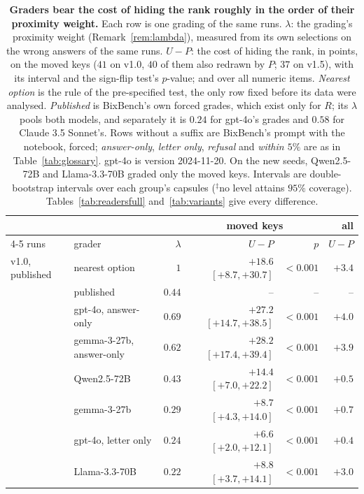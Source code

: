 \documentclass{article}
\begin{document}
\begin{table}[htbp]
\centering\footnotesize\setlength{\tabcolsep}{3pt}
\caption{\textbf{Graders bear the cost of hiding the rank roughly in the order of their proximity weight.} Each row is
one grading of the same runs. $\lambda$: the grading's proximity weight (Remark~\ref{rem:lambda}), measured from its
own selections on the wrong answers of the same runs. $U-P$: the cost of hiding the rank, in points, on the moved
keys ($41$ on v1.0, $40$ of them also redrawn by $P$; $37$ on v1.5), with its interval and the sign-flip test's
$p$-value; and over all numeric items. \emph{Nearest option} is the rule of the pre-specified test, the only row fixed
before its data were analysed. \emph{Published} is BixBench's own forced grades, which exist only for $R$; its
$\lambda$ pools both models, and separately it is $0.24$ for gpt-4o's grades and $0.58$ for Claude 3.5 Sonnet's.
Rows without a suffix are BixBench's prompt with the notebook, forced; \emph{answer-only}, \emph{letter only},
\emph{refusal} and \emph{within $5\%$} are as in Table~\ref{tab:glossary}. gpt-4o is version 2024-11-20. On the new seeds,
Qwen2.5-72B and Llama-3.3-70B graded only the moved keys. Intervals are double-bootstrap intervals over each group's
capsules ($^{\ddagger}$no level attains $95\%$ coverage). Tables~\ref{tab:readersfull} and~\ref{tab:variants} give
every difference.}
\label{tab:readers2}
\begin{tabular}{llrrrr}
\toprule
& & & \multicolumn{2}{c}{moved keys} & all\\
\cmidrule(lr){4-5}
runs & grader & $\lambda$ & $U-P$ & $p$ & $U-P$\\
\midrule
v1.0, published & nearest option & $1$ & $+18.6$ {\scriptsize$[+8.7,+30.7]$} & $<0.001$ & $+3.4$\\
 & published & $0.44$ & -- & -- & --\\
 & gpt-4o, answer-only & $0.69$ & $+27.2$ {\scriptsize$[+14.7,+38.5]$} & $<0.001$ & $+4.0$\\
 & gemma-3-27b, answer-only & $0.62$ & $+28.2$ {\scriptsize$[+17.4,+39.4]$} & $<0.001$ & $+3.9$\\
 & Qwen2.5-72B & $0.43$ & $+14.4$ {\scriptsize$[+7.0,+22.2]$} & $<0.001$ & $+0.5$\\
 & gemma-3-27b & $0.29$ & $+8.7$ {\scriptsize$[+4.3,+14.0]$} & $<0.001$ & $+0.7$\\
 & gpt-4o, letter only & $0.24$ & $+6.6$ {\scriptsize$[+2.0,+12.1]$} & $<0.001$ & $+0.4$\\
 & Llama-3.3-70B & $0.22$ & $+8.8$ {\scriptsize$[+3.7,+14.1]$} & $<0.001$ & $+3.0$\\

\end{tabular}
\end{table}
\end{document}
